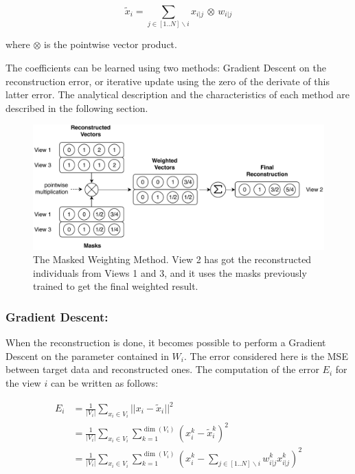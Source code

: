     \begin{equation}
\label{eq:final}
        \widetilde{x}_i = \sum_{j \in [1..N] \backslash i} x_{i|j} \, \otimes \, w_{i|j}
    \end{equation}
	
where $\otimes$ is the pointwise vector product.
		
The coefficients can be learned using two methods: Gradient Descent on the reconstruction error, or iterative update using the zero of the derivate of this latter error. The analytical description and the characteristics of each method are described in the following section. 
		
	\begin{figure}[h]
		\centering
		\includegraphics[width=\textwidth]{img/mwm.pdf}
        \caption{The Masked Weighting Method. View 2 has got the reconstructed
        individuals from Views 1 and 3, and it uses the masks previously trained
        to get the final weighted result.}
\label{fig:mwm}
	\end{figure}
	
        \subsubsection{Gradient Descent:}
When the reconstruction is done, it becomes possible to perform a Gradient Descent on the parameter contained in $W_i$. The error considered here is the MSE between target data and reconstructed ones. The computation of the error $E_i$ for the view $i$ can be written as follows:
		
    \begin{align*}
        E_i &= \frac{1}{|V_i|}\sum_{x_i \in V_i}||x_i - \widetilde{x}_i||^2\\
        &= \frac{1}{|V_i|}\sum_{x_i \in V_i}\sum_{k=1}^{\dim(V_i)}{(x_i^k - \widetilde{x}_i^k)}^2\\
        &= \frac{1}{|V_i|}\sum_{x_i \in V_i}\sum_{k=1}^{\dim(V_i)}{(x_i^k -
        \sum_{j \in [1..N] \backslash i} w_{i|j}^k x_{i|j}^k)}^2
    \end{align*}
		
